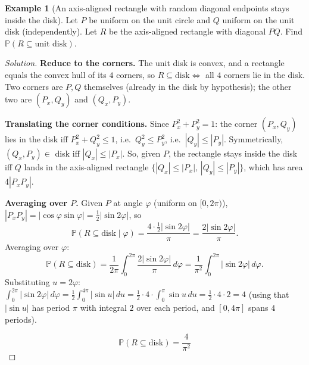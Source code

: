 \documentclass[11pt]{article}
\theoremstyle{definition}
\newtheorem{example}{Example}[section]
\begin{document}
\begin{example}[An axis-aligned rectangle with random diagonal endpoints stays inside the disk]
Let $P$ be uniform on the unit circle and $Q$ uniform on the unit disk (independently). Let $R$ be the axis-aligned rectangle with diagonal $PQ$. Find $\mathbb P(R\subseteq\text{unit disk})$.
\end{example}
\begin{proof}[Solution]
\textbf{Reduce to the corners.} The unit disk is convex, and a rectangle equals the convex hull of its $4$ corners, so $R\subseteq\text{disk}\iff$ all $4$ corners lie in the disk. Two corners are $P,Q$ themselves (already in the disk by hypothesis); the other two are $(P_x,Q_y)$ and $(Q_x,P_y)$.

\textbf{Translating the corner conditions.} Since $P_x^2+P_y^2=1$: the corner $(P_x,Q_y)$ lies in the disk iff $P_x^2+Q_y^2\le1$, i.e.\ $Q_y^2\le P_y^2$, i.e.\ $|Q_y|\le|P_y|$. Symmetrically, $(Q_x,P_y)\in$ disk iff $|Q_x|\le|P_x|$. So, given $P$, the rectangle stays inside the disk iff $Q$ lands in the axis-aligned rectangle $\{|Q_x|\le|P_x|,\,|Q_y|\le|P_y|\}$, which has area $4|P_x P_y|$.

\textbf{Averaging over $P$.} Given $P$ at angle $\varphi$ (uniform on $[0,2\pi)$), $|P_xP_y|=|\cos\varphi\sin\varphi|=\tfrac12|\sin2\varphi|$, so
\[
\mathbb P(R\subseteq\text{disk}\mid\varphi)=\frac{4\cdot\tfrac12|\sin2\varphi|}{\pi}=\frac{2|\sin2\varphi|}\pi.
\]
Averaging over $\varphi$:
\[
\mathbb P(R\subseteq\text{disk})=\frac1{2\pi}\int_0^{2\pi}\frac{2|\sin2\varphi|}\pi\,d\varphi=\frac1{\pi^2}\int_0^{2\pi}|\sin2\varphi|\,d\varphi.
\]
Substituting $u=2\varphi$: $\int_0^{2\pi}|\sin2\varphi|\,d\varphi=\tfrac12\int_0^{4\pi}|\sin u|\,du=\tfrac12\cdot4\cdot\int_0^\pi\sin u\,du=\tfrac12\cdot4\cdot2=4$ (using that $|\sin u|$ has period $\pi$ with integral $2$ over each period, and $[0,4\pi]$ spans $4$ periods).

\[
\boxed{\mathbb P(R\subseteq\text{disk})=\frac4{\pi^2}}
\]
\end{proof}
\end{document}
